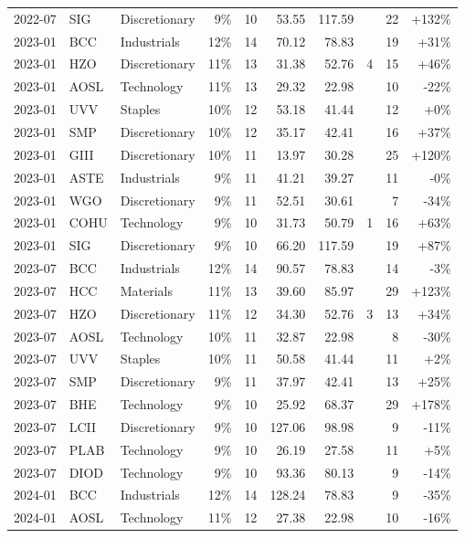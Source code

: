 \documentclass[11pt,a4paper]{article}
\begin{document}
{\begin{longtable}{l l l r r r r r r r}
2022-07 & SIG & Discretionary & 9\% & 10 & 53.55 & 117.59 &  & 22 & +132\% \\
2023-01 & BCC & Industrials & 12\% & 14 & 70.12 & 78.83 &  & 19 & +31\% \\
2023-01 & HZO & Discretionary & 11\% & 13 & 31.38 & 52.76 & 4 & 15 & +46\% \\
2023-01 & AOSL & Technology & 11\% & 13 & 29.32 & 22.98 &  & 10 & -22\% \\
2023-01 & UVV & Staples & 10\% & 12 & 53.18 & 41.44 &  & 12 & +0\% \\
2023-01 & SMP & Discretionary & 10\% & 12 & 35.17 & 42.41 &  & 16 & +37\% \\
2023-01 & GIII & Discretionary & 10\% & 11 & 13.97 & 30.28 &  & 25 & +120\% \\
2023-01 & ASTE & Industrials & 9\% & 11 & 41.21 & 39.27 &  & 11 & -0\% \\
2023-01 & WGO & Discretionary & 9\% & 11 & 52.51 & 30.61 &  & 7 & -34\% \\
2023-01 & COHU & Technology & 9\% & 10 & 31.73 & 50.79 & 1 & 16 & +63\% \\
2023-01 & SIG & Discretionary & 9\% & 10 & 66.20 & 117.59 &  & 19 & +87\% \\
2023-07 & BCC & Industrials & 12\% & 14 & 90.57 & 78.83 &  & 14 & -3\% \\
2023-07 & HCC & Materials & 11\% & 13 & 39.60 & 85.97 &  & 29 & +123\% \\
2023-07 & HZO & Discretionary & 11\% & 12 & 34.30 & 52.76 & 3 & 13 & +34\% \\
2023-07 & AOSL & Technology & 10\% & 11 & 32.87 & 22.98 &  & 8 & -30\% \\
2023-07 & UVV & Staples & 10\% & 11 & 50.58 & 41.44 &  & 11 & +2\% \\
2023-07 & SMP & Discretionary & 9\% & 11 & 37.97 & 42.41 &  & 13 & +25\% \\
2023-07 & BHE & Technology & 9\% & 10 & 25.92 & 68.37 &  & 29 & +178\% \\
2023-07 & LCII & Discretionary & 9\% & 10 & 127.06 & 98.98 &  & 9 & -11\% \\
2023-07 & PLAB & Technology & 9\% & 10 & 26.19 & 27.58 &  & 11 & +5\% \\
2023-07 & DIOD & Technology & 9\% & 10 & 93.36 & 80.13 &  & 9 & -14\% \\
2024-01 & BCC & Industrials & 12\% & 14 & 128.24 & 78.83 &  & 9 & -35\% \\
2024-01 & AOSL & Technology & 11\% & 12 & 27.38 & 22.98 &  & 10 & -16\% \\

\end{longtable}}
\end{document}
